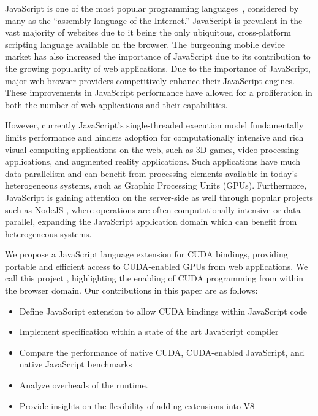 JavaScript is one of the most popular programming languages~\cite{top10}, 
considered by many as the ``assembly language of the Internet.'' JavaScript is
prevalent in the vast majority of websites due to it being the only
ubiquitous, cross-platform scripting language available on the browser. The 
burgeoning mobile device market has also increased the importance of JavaScript due
to its contribution to the growing  popularity of web applications.
Due to the importance of JavaScript, major web browser providers competitively
enhance their JavaScript engines. These improvements in JavaScript performance
have allowed for a proliferation in both the number of web applications and
their capabilities.  

However, currently JavaScript's single-threaded execution model fundamentally limits
performance and hinders adoption for computationally intensive and rich visual
computing applications on the web, such as 3D games, video processing
applications, and augmented reality applications. Such applications have much data
parallelism and can benefit from processing elements available in today’s
heterogeneous systems, such as Graphic Processing Units (GPUs).  Furthermore,
JavaScript is gaining attention on the server-side as well through popular
projects such as NodeJS \cite{nodeJS}, where operations are often
computationally intensive or data-parallel, expanding the JavaScript application
domain which can benefit from heterogeneous systems.

We propose a JavaScript language extension for CUDA bindings, providing portable
and efficient access to CUDA-enabled GPUs from web applications.  We call this
project \namens, highlighting the enabling of CUDA programming from within the
browser domain. Our contributions in this paper are as follows:


\begin{itemize}

\item Define JavaScript extension to allow CUDA bindings within JavaScript code
\item Implement \name specification within a state of the art JavaScript compiler
\item Compare the performance of native CUDA, CUDA-enabled JavaScript, and native JavaScript benchmarks
\item Analyze overheads of the \name runtime.
\item Provide insights on the flexibility of adding extensions into V8

\end{itemize}

